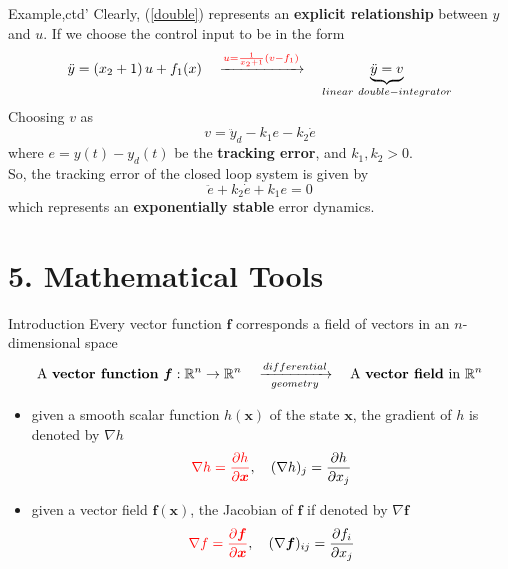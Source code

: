 \documentclass{beamer}
\renewcommand{\vec}[1]{\ensuremath{\boldsymbol{#1}}} %
\begin{document}
\begin{frame}{Example,ctd'}
    Clearly, (\ref{double}) represents an \textbf{explicit relationship} between $y$ and $u$.  If we choose the control input to be in the form
    $$
         \ddot{y}=\left(x_{2}+1\right) u+f_{1}(x) \quad \xrightarrow{ {\color{red}u=\frac{1}{x_{2}+1}\left(v-f_{1}\right)}} \quad \underbrace{\ddot{y} = v}_{linear~double-integrator}
    $$
Choosing $v$ as
\begin{equation}\label{choose-v}
  v = \ddot{y}_{d}-k_{1}e-k_{2}\dot{e}
\end{equation}
where $e=y(t)-y_{d}(t)$ be the \textbf{tracking error}, and $k_{1}, k_{2} > 0$.\\
So, the tracking error of the closed loop system is given by
$$
\ddot{e}+k_{2} \dot{e}+k_{1} e = 0
$$
which represents an \textbf{exponentially stable} error dynamics.
\end{frame}



\section{5. Mathematical Tools}

\begin{frame}{Introduction}
Every vector function \vec{f} corresponds a field of vectors in an $n$-dimensional space
$$
\text{A \textbf{vector function}}~\vec{f}:\mathbb{R}^{n}\rightarrow \mathbb{R}^{n} \quad \xrightarrow[geometry]{differential} \quad \text{A \textbf{vector field} in}~\mathbb{R}^{n}
$$

\begin{itemize}
  \item given a smooth scalar function $h(\vec{x})$ of the state \vec{x}, the gradient of $h$ is denoted by $\nabla h$
      $$
      {\color{red}\nabla h = \frac{\partial h}{\partial \vec{x}}}, \quad (\nabla h)_{j} = \frac{\partial h}{\partial x_{j}}
      $$
  \item given a vector field $\vec{f}(\vec{x})$, the Jacobian of \vec{f} if denoted by $\nabla \vec{f}$
      $$
      {\color{red}\nabla f = \frac{\partial \vec{f}}{\partial \vec{x}}}, \quad (\nabla \vec{f})_{ij} = \frac{\partial f_{i}}{\partial x_{j}}
      $$
\end{itemize}
\end{frame}
\end{document}

